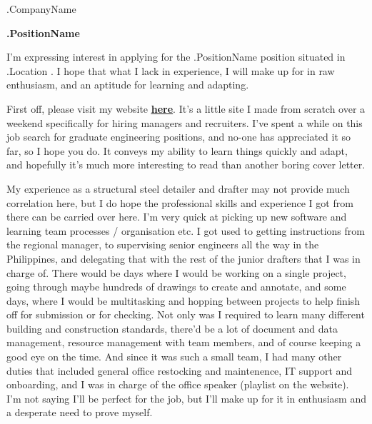 \documentclass[10pt]{letter}
\begin{document}


\thispagestyle{empty}

\address{Deon Chen \\
    i.am.deon.chen@gmail.com \\ 
    (+61) 0430 342 826
}

\begin{letter}{
    {{ .CompanyName }}
} 

\signature{Deon Chen}

\opening{}

\textbf{
    {{.PositionName}}
}

I'm expressing interest in applying for the {{ .PositionName }} position situated in {{ .Location }}. I hope that what I lack in experience, I will make up for in raw enthusiasm, and an aptitude for learning and adapting. 

First off, please visit my website \underline{\textbf{\href{https://zabuzabuzaza.github.io/home/dear_recruiters/}{here}}}. It's a little site I made from scratch over a weekend specifically for hiring managers and recruiters. I've spent a while on this job search for graduate engineering positions, and no-one has appreciated it so far, so I hope you do. It conveys my ability to learn things quickly and adapt, and hopefully it's much more interesting to read than another boring cover letter. 

My experience as a structural steel detailer and drafter may not provide much correlation here, but I do hope the professional skills and experience I got from there can be carried over here. I'm very quick at picking up new software and learning team processes / organisation etc. I got used to getting instructions from the regional manager, to supervising senior engineers all the way in the Philippines, and delegating that with the rest of the junior drafters that I was in charge of. There would be days where I would be working on a single project, going through maybe hundreds of drawings to create and annotate, and some days, where I would be multitasking and hopping between projects to help finish off for submission or for checking. Not only was I required to learn many different building and construction standards, there'd be a lot of document and data management, resource management with team members, and of course keeping a good eye on the time. And since it was such a small team, I had many other duties that included general office restocking and maintenence, IT support and onboarding, and I was in charge of the office speaker (playlist on the website). I'm not saying I'll be perfect for the job, but I'll make up for it in enthusiasm and a desperate need to prove myself. 


\end{letter}
\end{document}
